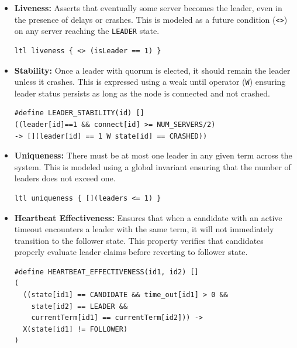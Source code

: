 \documentclass[a4paper]{llncs}
\begin{document}
\begin{itemize}
    \item \textbf{Liveness:} \label{prop:liveness} Asserts that eventually some server becomes the leader, even in the presence of delays or crashes. This is modeled as a future condition (\texttt{<>}) on any server reaching the \texttt{LEADER} state.
    
    \begin{lstlisting}[style=promela, caption={LTL Formula for Liveness}, label={lst:ltl_liveness}]
ltl liveness { <> (isLeader == 1) }
    \end{lstlisting}
    
    \item \textbf{Stability:} \label{prop:stability} Once a leader with quorum is elected, it should remain the leader unless it crashes. This is expressed using a weak until operator (\texttt{W}) ensuring leader status persists as long as the node is connected and not crashed.
    
    \begin{lstlisting}[style=promela, caption={LTL Formula for Leader Stability}, label={lst:ltl_stability}]
#define LEADER_STABILITY(id) [] 
((leader[id]==1 && connect[id] >= NUM_SERVERS/2) 
-> [](leader[id] == 1 W state[id] == CRASHED))
    \end{lstlisting}
    
    \item \textbf{Uniqueness:} \label{prop:uniqueness} There must be at most one leader in any given term across the system. This is modeled using a global invariant ensuring that the number of leaders does not exceed one.

    \begin{lstlisting}[style=promela, caption={LTL Formula for Uniqueness}, label={lst:ltl_uniqueness}]
ltl uniqueness { [](leaders <= 1) }
    \end{lstlisting}

    \item \textbf{Heartbeat Effectiveness:} \label{prop:heartbeat_effectiveness} Ensures that when a candidate with an active timeout encounters a leader with the same term, it will not immediately transition to the follower state. This property verifies that candidates properly evaluate leader claims before reverting to follower state.
    
    \begin{lstlisting}[style=promela, caption={LTL Formula for Heartbeat Effectiveness}, label={lst:ltl_heartbeat_effectiveness}]
#define HEARTBEAT_EFFECTIVENESS(id1, id2) []
(
  ((state[id1] == CANDIDATE && time_out[id1] > 0 && 
    state[id2] == LEADER && 
    currentTerm[id1] == currentTerm[id2])) -> 
  X(state[id1] != FOLLOWER)
)
    \end{lstlisting}
    

\end{itemize}
\end{document}
